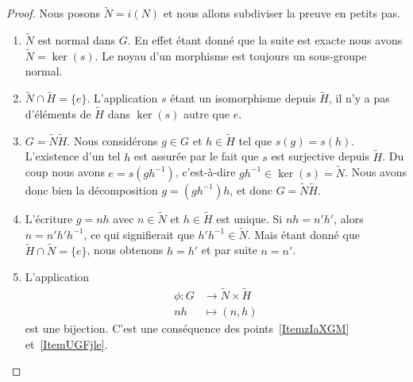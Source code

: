 \begin{proof}
    Nous posons \( \tilde N=i(N)\) et nous allons subdiviser la preuve en petits pas.

    \begin{enumerate}
        \item  \( \tilde N\) est normal dans \( G\). En effet étant donné que la suite est exacte nous avons \( \tilde N=\ker(s)\). Le noyau d'un morphisme est toujours un sous-groupe normal.

        \item \( \tilde N\cap\tilde H=\{ e \}\). L'application \( s\) étant un isomorphisme depuis $\tilde H$, il n'y a pas d'éléments de \( \tilde H\) dans \( \ker(s)\) autre que $e$.

        \item\label{ItemzIaXGM} \( G=\tilde N\tilde H\). Nous considérons \( g\in G\) et \( h\in \tilde H\) tel que \( s(g)=s(h)\). L'existence d'un tel \( h\) est assurée par le fait que \( s\) est surjective depuis \( \tilde H\). Du coup nous avons \( e=s(gh^{-1})\), c'est-à-dire \( gh^{-1}\in \ker (s)=\tilde N\). Nous avons donc bien la décomposition \( g=(gh^{-1})h\), et donc \( G=\tilde N\tilde H\).

        \item\label{ItemUGFjle} L'écriture \( g=nh\) avec \( n\in \tilde N\) et \( h\in \tilde H\) est unique. Si \( nh=n'h'\), alors \( n=n'h'h^{-1}\), ce qui signifierait que \( h'h^{-1}\in\tilde N\). Mais étant donné que \( \tilde H\cap\tilde N=\{ e \}\), nous obtenons \( h=h'\) et par suite \( n=n'\).

        \item   \label{ItemUZlrKo}
            L'application
            \begin{equation}
                \begin{aligned}
                    \phi\colon G&\to \tilde N\times \tilde H \\
                    nh&\mapsto (n,h)
                \end{aligned}
            \end{equation}
            est une bijection. C'est une conséquence des points~\ref{ItemzIaXGM} et~\ref{ItemUGFjle}.


\end{enumerate}
\end{proof}
